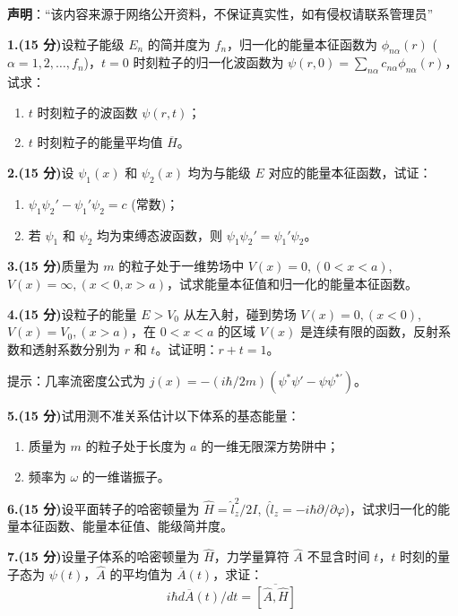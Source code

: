 
\textbf{声明}：“该内容来源于网络公开资料，不保证真实性，如有侵权请联系管理员”

\textbf{1.(15 分)}设粒子能级 $E_n$ 的简并度为 $f_n$，归一化的能量本征函数为 $\phi_{n\alpha}(r)$ ($\alpha = 1,2,\dots,f_n$)，$t = 0$ 时刻粒子的归一化波函数为 $\psi(r,0) = \sum_{n\alpha} c_{n\alpha} \phi_{n\alpha}(r)$，试求：

\begin{enumerate}
    \item $t$ 时刻粒子的波函数 $\psi(r,t)$；
    \item $t$ 时刻粒子的能量平均值 $ \overline{H} $。
\end{enumerate}

\textbf{2.(15 分)}设 $\psi_1(x)$ 和 $\psi_2(x)$ 均为与能级 $E$ 对应的能量本征函数，试证：
\begin{enumerate}
    \item $\psi_1 \psi_2' - \psi_1' \psi_2 = c$ (常数)；
    \item 若 $\psi_1$ 和 $\psi_2$ 均为束缚态波函数，则 $\psi_1 \psi_2' = \psi_1' \psi_2$。
\end{enumerate}

\textbf{3.(15 分)}质量为 $m$ 的粒子处于一维势场中 $V(x) = 0, (0 < x < a)$, $V(x) = \infty, (x < 0, x > a)$，试求能量本征值和归一化的能量本征函数。

\textbf{4.(15 分)}设粒子的能量 $E > V_0$ 从左入射，碰到势场 $V(x) = 0, (x < 0)$, $V(x) = V_0, (x > a)$，在 $0 < x < a$ 的区域 $V(x)$ 是连续有限的函数，反射系数和透射系数分别为 $r$ 和 $t$。试证明：$r + t = 1$。

提示：几率流密度公式为 $j(x) = -(i\hbar/2m)(\psi^*\psi'  - \psi\psi^{*'})$。

\textbf{5.(15 分)}试用测不准关系估计以下体系的基态能量：
\begin{enumerate}
    \item 质量为 $m$ 的粒子处于长度为 $a$ 的一维无限深方势阱中；
    \item 频率为 $\omega$ 的一维谐振子。
\end{enumerate}

\textbf{6.(15 分)}设平面转子的哈密顿量为 $\hat{H} = \hat{l}_z^2/2I$, ($\hat{l}_z = -i\hbar \partial/ \partial \varphi$)，试求归一化的能量本征函数、能量本征值、能级简并度。

\textbf{7.(15 分)}设量子体系的哈密顿量为 $\hat{H}$，力学量算符 $\hat{A}$ 不显含时间 $t$，$t$ 时刻的量子态为 $\psi(t)$，$\hat{A}$ 的平均值为 $\overline{A}(t)$，求证：
\[
i\hbar d\overline{A}(t)/dt = \overline{[\hat{A}, \hat{H}]}~
\]


